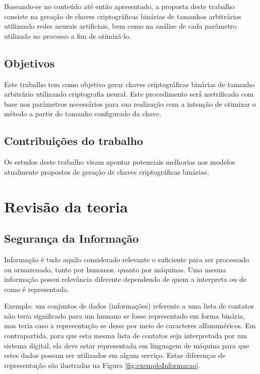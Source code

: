 \documentclass[12pt]{article}
\begin{document}
        Baseando-se no conteúdo até então apresentado, a proposta deste trabalho consiste na geração de chaves criptográficas binárias de tamanhos arbitrários utilizando redes neurais artificiais, bem como na análise de cada parâmetro utilizado no processo a fim de otimizá-lo.
    
        \subsection{Objetivos}
            Este trabalho tem como objetivo gerar chaves criptográficas binárias de tamanho arbitrário utilizando criptografia neural. Este procedimento será metrificado com base nos parâmetros necessários para sua realização com a intenção de otimizar o método a partir do tamanho configurado da chave.
    
        \subsection{Contribuições do trabalho}
            Os estudos deste trabalho visam apontar potenciais melhorias nos modelos atualmente propostos de geração de chaves criptográficas binárias.

    \section{Revisão da teoria}
    \label{sec:revisao_da_teoria}

        \subsection{Segurança da Informação}
        \label{subsec:seguranca_da_informacao}
        
            Informação é tudo aquilo considerado relevante o suficiente para ser processado ou armazenado, tanto por humanos, quanto por máquinas. Uma mesma informação possui relevância diferente dependendo de quem a interpreta ou de como é representada.
            
            Exemplo: um conjuntos de dados (informações) referente a uma lista de contatos não teria significado para um humano se fosse representado em forma binária, mas teria caso a representação se desse por meio de caracteres alfanuméricos. Em contrapartida, para que esta mesma lista de contatos seja interpretada por um sistema digital, ela deve estar representada em linguagem de máquina para que estes dados possam ser utilizados em algum serviço. Estas diferenças de representação são ilustradas na Figura \ref{fig:exemploInformacao}.
\end{document}
